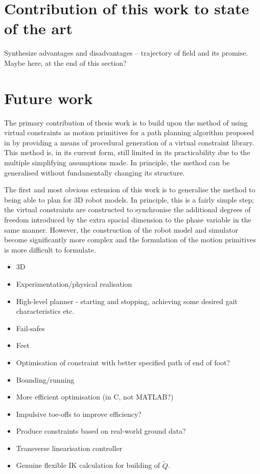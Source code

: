 \section{Contribution of this work to state of the art}
Synthesize advantages and disadvantages -- trajectory of field and its promise. Maybe here, at the end of this section?

\section{Future work}
The primary contribution of thesis work is to build upon the method of using virtual constraints as motion primitives for a path planning algorithm proposed in \cite{manchester13planning} by providing a means of procedural generation of a virtual constraint library. This method is, in its current form, still limited in its practicability due to the multiple simplifying assumptions made. In principle, the method can be generalised without fundamentally changing its structure.

The first and most obvious extension of this work is to generalise the method to being able to plan for 3D robot models. In principle, this is a fairly simple step; the virtual constraints are constructed to synchronise the additional degrees of freedom introduced by the extra spacial dimension to the phase variable in the same manner. However, the construction of the robot model and simulator become significantly more complex and the formulation of the motion primitives is more difficult to formulate.



\begin{itemize}
	\item 3D
	\item Experimentation/physical realisation
	\item High-level planner - starting and stopping, achieving some desired gait characteristics etc.
	\item Fail-safes
	\item Feet
	\item Optimisation of constraint with better specified path of end of foot?
	\item Bounding/running
	\item More efficient optimisation (in C, not MATLAB?)
	\item Impulsive toe-offs to improve efficiency?
	\item Produce constraints based on real-world ground data?
	\item Transverse linearisation controller
	\item Genuine flexible IK calculation for building of $\tilde{Q}$.
\end{itemize}